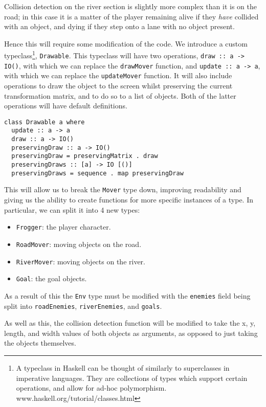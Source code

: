 \documentclass[12pt, a4paper]{report}
\begin{document}
Collision detection on the river section is slightly more complex than it is on the road; in this case it is a matter of the player remaining alive if they \textit{have} collided with an object, and dying if they step onto a lane with no object present.

Hence this will require some modification of the code.
We introduce a custom typeclass\footnote{A typeclass in Haskell can be thought of similarly to superclasses in imperative languages.
They are collections of types which support certain operations, and allow for ad-hoc polymorphism. www.haskell.org/tutorial/classes.html}, \verb|Drawable|.
This typeclass will have two operations, \verb|draw :: a -> IO()|, with which we can replace the \verb|drawMover| function, and \verb|update :: a -> a|, with which we can replace the \verb|updateMover| function.
It will also include operations to draw the object to the screen whilst preserving the current transformation matrix, and to do so to a list of objects.
Both of the latter operations will have default definitions.

\begin{lstlisting}
class Drawable a where
  update :: a -> a
  draw :: a -> IO()
  preservingDraw :: a -> IO()
  preservingDraw = preservingMatrix . draw
  preservingDraws :: [a] -> IO [()]
  preservingDraws = sequence . map preservingDraw
\end{lstlisting}

This will allow us to break the \verb|Mover| type down, improving readability and giving us the ability to create functions for more specific instances of a type.
In particular, we can split it into 4 new types:
\begin{itemize}
  \item \verb|Frogger|: the player character.
    \item \verb|RoadMover|: moving objects on the road.
    \item \verb|RiverMover|: moving objects on the river.
    \item \verb|Goal|: the goal objects.
\end{itemize}

\par

As a result of this the \verb|Env| type must be modified with the \verb|enemies| field being split into \verb|roadEnemies|, \verb|riverEnemies|, and \verb|goals|.

As well as this, the collision detection function will be modified to take the x, y, length, and width values of both objects as arguments, as opposed to just taking the objects themselves.
\end{document}
